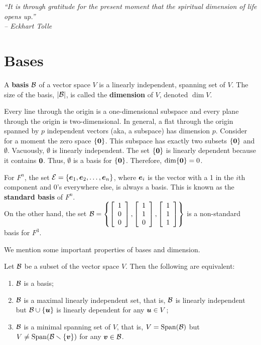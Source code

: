 \begin{center} 
\emph{``It is through gratitude for the present moment that the spiritual dimension of life opens up.''\\ -- Eckhart Tolle}
\end{center}

\section{Bases}\label{sec:basis}
\begin{Def}  A \textbf{basis} $\mathcal{B}$ of a vector space $V$ is a linearly independent, spanning set of $V$. The size of the basis, $|\mathcal{B}|$, is called the \textbf{dimension} of $V$, denoted $\dim V$.
\end{Def}\vs

Every line through the origin is a one-dimensional subspace and every plane through the origin is two-dimensional. In general, a flat through the origin spanned by $p$ independent vectors (aka, a subspace) has dimension $p$. Consider for a moment the zero space $\{\boldsymbol 0\}$. This subspace has exactly two subsets $\{\boldsymbol 0\}$ and $\emptyset$. Vacuously, $\emptyset$ is linearly independent\footnotemark[2]. The set $\{\boldsymbol 0\}$ is linearly dependent because it contains $\boldsymbol 0$. Thus, $\emptyset$ is a basis for $\{\boldsymbol 0\}$. Therefore, $\dim \{\boldsymbol 0\} = 0$.\\

\begin{Exam} For $F^n$, the set $\mathcal{E} = \{\boldsymbol e_1, \boldsymbol e_2, \ldots, \boldsymbol e_n\}$, where $\boldsymbol e_i$ is the vector with a 1 in the $i$th component and 0's everywhere else, is always a basis. This is known as the \textbf{standard basis} of $F^n$.\\

On the other hand, the set $\mathcal{B} = \left\{\left[\begin{array}{r} 1\\0\\0 \end{array}\right], \left[\begin{array}{r} 1\\1\\0 \end{array}\right], \left[\begin{array}{r} 1\\1\\1 \end{array}\right]\right\}$ is a non-standard basis for $F^3$.
\end{Exam}\vs

We mention some important properties of bases and dimension.

\begin{Thm} Let $\mathcal{B}$ be a subset of the vector space $V$. Then the following are equivalent:
\begin{enumerate}[!THM!, start=1]
\item $\mathcal{B}$ is a basis;
\item $\mathcal{B}$ is a maximal linearly independent set, that is, $\mathcal{B}$ is linearly independent but $\mathcal{B}\cup \{\boldsymbol u\}$ is linearly dependent for any $\boldsymbol u\in V$; 
\item $\mathcal{B}$ is a minimal spanning set of $V$, that is, $V=\operatorname{Span}(\mathcal{B})$ but $V\neq \operatorname{Span}(\mathcal{B}\smallsetminus \{\boldsymbol v\})$ for any $\boldsymbol v\in \mathcal{B}$.
\end{enumerate}
\end{Thm}

